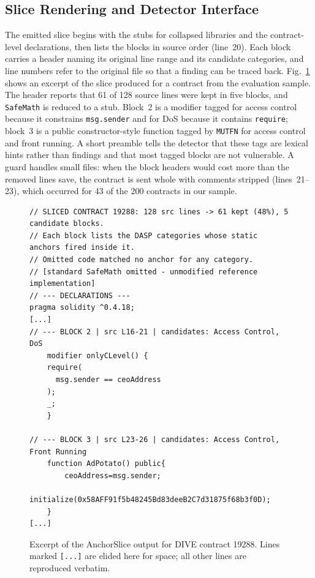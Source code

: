 \documentclass{ieeeaccess}
\begin{document}
\subsection{Slice Rendering and Detector Interface}\label{subsec:render}
The emitted slice begins with the stubs for collapsed libraries and the contract-level declarations, then lists the blocks in source order (line~20). Each block carries a header naming its original line range and its candidate categories, and line numbers refer to the original file so that a finding can be traced back. Fig.~\ref{fig:slice_example} shows an excerpt of the slice produced for a contract from the evaluation sample. The header reports that 61 of 128 source lines were kept in five blocks, and \texttt{SafeMath} is reduced to a stub. Block~2 is a modifier tagged for access control because it constrains \texttt{msg.sender} and for DoS because it contains \texttt{require}; block~3 is a public constructor-style function tagged by \texttt{MUTFN} for access control and front running. A short preamble tells the detector that these tags are lexical hints rather than findings and that most tagged blocks are not vulnerable. A guard handles small files: when the block headers would cost more than the removed lines save, the contract is sent whole with comments stripped (lines~21--23), which occurred for 43 of the 200 contracts in our sample.

\begin{figure}[htbp]
\centering
\begin{lstlisting}
// SLICED CONTRACT 19288: 128 src lines -> 61 kept (48%), 5 candidate blocks.
// Each block lists the DASP categories whose static anchors fired inside it.
// Omitted code matched no anchor for any category.
// [standard SafeMath omitted - unmodified reference implementation]
// --- DECLARATIONS ---
pragma solidity ^0.4.18;
[...]
// --- BLOCK 2 | src L16-21 | candidates: Access Control, DoS
    modifier onlyCLevel() {
    require(
      msg.sender == ceoAddress
    );
    _;
    }

// --- BLOCK 3 | src L23-26 | candidates: Access Control, Front Running
    function AdPotato() public{
        ceoAddress=msg.sender;
        initialize(0x58AFF91f5b48245Bd83deeB2C7d31875f68b3f0D);
    }
[...]
\end{lstlisting}
\caption{Excerpt of the AnchorSlice output for DIVE contract 19288. Lines marked \texttt{[...]} are elided here for space; all other lines are reproduced verbatim.}
\label{fig:slice_example}
\end{figure}
\end{document}
